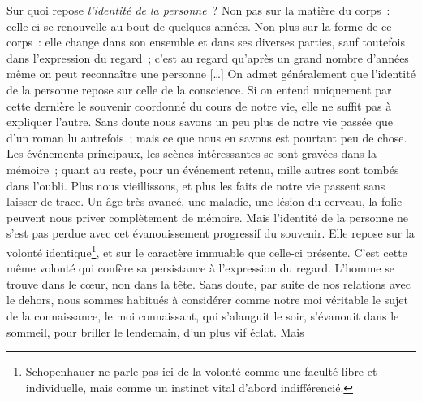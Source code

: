 
	{Sur quoi repose \textit{l'identité de la personne}~? Non pas sur la
matière du corps~: celle-ci se renouvelle au bout de quelques années.
Non plus sur la forme de ce corps~: elle change dans son ensemble et
dans ses diverses parties, sauf toutefois dans l'expression du regard~;
c'est au regard qu'après un grand nombre d'années même on peut
reconnaître une personne […] On admet généralement que l'identité de
la personne repose sur celle de la conscience. Si on entend
uniquement par cette dernière le souvenir coordonné du cours de notre
vie, elle ne suffit pas à expliquer l'autre. Sans doute nous savons
un peu plus de notre vie passée que d'un roman lu autrefois~; mais ce
que nous en savons est pourtant peu de chose. Les événements
principaux, les scènes intéressantes se sont gravées dans la mémoire~;
quant au reste, pour un événement retenu, mille autres sont tombés
dans l'oubli. Plus nous vieillissons, et plus les faits de notre vie
passent sans laisser de trace. Un âge très avancé, une maladie, une
lésion du cerveau, la folie peuvent nous priver complètement de
mémoire. Mais l'identité de la personne ne s'est pas perdue avec cet
évanouissement progressif du souvenir. Elle repose sur la volonté
identique\footnote{Schopenhauer ne parle pas ici de la volonté comme
une faculté libre et individuelle, mais comme un instinct vital
d'abord indifférencié.}, et sur le caractère immuable que celle-ci
présente. C'est cette même volonté qui confère sa persistance à
l'expression du regard. L'homme se trouve dans le cœur, non dans la
tête. Sans doute, par suite de nos relations avec le dehors, nous
sommes habitués à considérer comme notre moi véritable le sujet de la
connaissance, le moi connaissant, qui s'alanguit le soir, s'évanouit
dans le sommeil, pour briller le lendemain, d'un plus vif éclat. Mais
}
